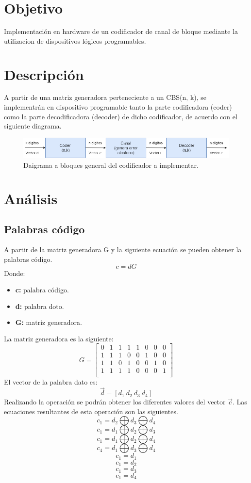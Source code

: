 \documentclass[12pt,letterpaper]{article}
\begin{document}

\newpage
\tableofcontents
\listoffigures
\listoftables

\newpage
\section{Objetivo}
Implementación en hardware de un codificador de canal de bloque mediante la utilizacion 
de dispositivos lógicos programables.

\section{Descripción}
A partir de una matriz generadora perteneciente a un CBS(n, k), se implementrán en dispositivo 
programable tanto la parte codificadora (coder) como la parte decodificadora (decoder) de dicho
codificador, de acuerdo con el siguiente diagrama.
\begin{figure}[ht]
    \centering
    \includegraphics[width=1\textwidth]{d0.png}
    \caption{Daigrama a bloques general del codificador a implementar.}
\end{figure}

\section{Análisis}
\subsection{Palabras código}
A partir de la matriz generadora G y la siguiente ecuación se pueden obtener la palabras código.
\begin{equation}
    c=d G
\end{equation}
Donde:
\begin{itemize}
    \item \textbf{c: } palabra código.
    \item \textbf{d: } palabra doto.
    \item \textbf{G: } matriz generadora.
\end{itemize}
La matriz generadora es la siguiente:
\[
G
=
\begin{bmatrix} 
    0 & 1 & 1 & 1 & 1 & 0 & 0 & 0 \\
    1 & 1 & 1 & 0 & 0 & 1 & 0 & 0 \\
    1 & 1 & 0 & 1 & 0 & 0 & 1 & 0 \\
    1 & 1 & 1 & 1 & 0 & 0 & 0 & 1 \\
    \end{bmatrix}
\]
El vector de la palabra dato es:
\begin{equation}
    \vec{d}=[d_1 \ d_2 \ d_3 \ d_4]
\end{equation}
Realizando la operación se podrán obtener los diferentes valores del vector $\vec{c}$.
Las ecuaciones resultantes de esta operación son las siguientes.
$$c_1=d_2 \bigoplus d_3 \bigoplus d_4$$
$$c_1=d_1 \bigoplus d_2 \bigoplus d_3$$
$$c_1=d_1 \bigoplus d_2 \bigoplus d_4$$
$$c_4=d_1 \bigoplus d_3 \bigoplus d_4$$
$$c_1=d_1$$
$$c_1=d_2$$
$$c_1=d_3$$
$$c_1=d_4$$
\end{document}
